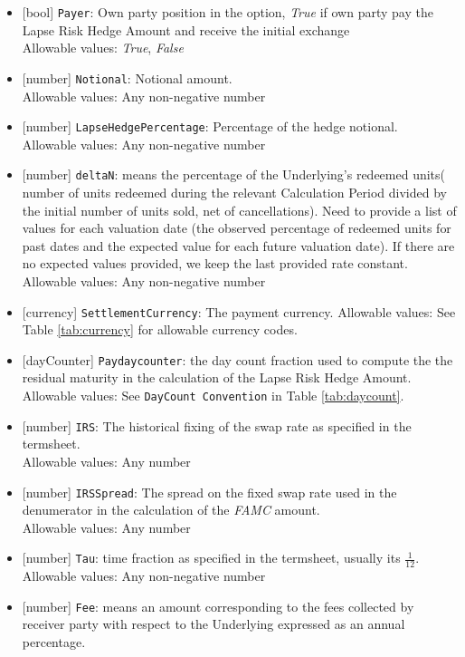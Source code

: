 \begin{itemize} 
  \item{}[bool] \lstinline!Payer!: Own party position in the option, \emph{True} if own party pay the Lapse Risk Hedge Amount and receive the initial exchange \\
  Allowable values: \emph{True}, \emph{False}
  \item{}[number] \lstinline!Notional!: Notional amount. \\
  Allowable values: Any non-negative number
  \item{}[number] \lstinline!LapseHedgePercentage!: Percentage of the hedge notional. \\
  Allowable values: Any non-negative number
  \item{}[number] \lstinline!deltaN!: means the  percentage  of  the  Underlying’s  redeemed  units(  number  of  units redeemed during the relevant Calculation Period divided by the initial number of units sold, net of cancellations). 
  Need to provide a list of values for each valuation date (the observed percentage of redeemed units for past dates and  the expected value for each future valuation date). If there are no expected values provided, we keep the last provided rate constant.
  Allowable values: Any non-negative number
  \item{}[currency] \lstinline!SettlementCurrency!: The payment currency.
  Allowable values: See Table \ref{tab:currency} for allowable currency codes.
  \item{}[dayCounter] \lstinline!Paydaycounter!:  the day count fraction used to compute the the residual maturity in the calculation of the Lapse Risk Hedge Amount. \\
  Allowable values: See \lstinline!DayCount Convention! in Table \ref{tab:daycount}.
  \item{}[number] \lstinline!IRS!: The historical fixing of the swap rate as specified in the termsheet. \\
  Allowable values: Any number
  \item{}[number] \lstinline!IRSSpread!: The spread on the fixed swap rate used in the denumerator in the calculation of the \emph{FAMC} amount.\\
  Allowable values: Any number
  \item{}[number] \lstinline!Tau!: time fraction as specified in the termsheet, usually its $\frac{1}{12}$. \\
  Allowable values: Any non-negative number
  \item{}[number] \lstinline!Fee!: means  an  amount  corresponding  to  the  fees  collected  by receiver party with respect to the Underlying expressed as an annual percentage. \\

\end{itemize}

